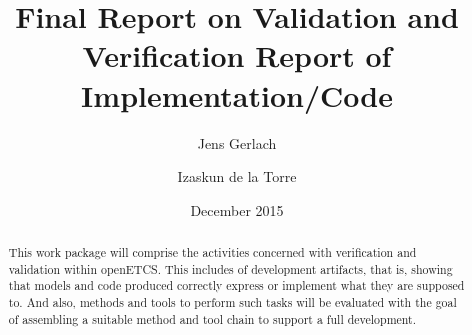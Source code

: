 \documentclass{template/openetcs_report}
\numberwithin{figure}{chapter}
\numberwithin{table}{chapter}
\begin{document}
\frontmatter
{}




\title{Final Report on Validation and Verification Report of Implementation/Code}


\date{December 2015}






\author{Jens Gerlach}

\author{Izaskun de la Torre}



\sloppy %

\begin{abstract}
  This work package will comprise the activities concerned with
  verification and validation within openETCS. This includes \vv of
  development artifacts, that is, showing that models and code
  produced correctly express or implement what they are supposed
  to. And also, methods and tools to perform such tasks will be
  evaluated with the goal of assembling a suitable method and tool
  chain to support a full development.
\end{abstract}
\end{document}
